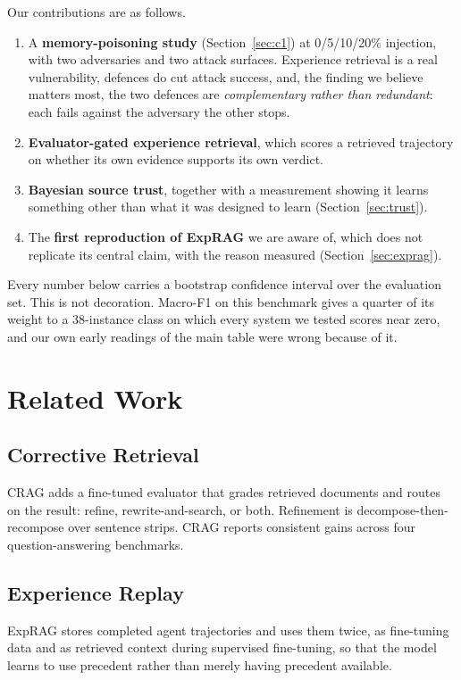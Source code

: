 \documentclass[journal]{IEEEtran}
\begin{document}
Our contributions are as follows.

\begin{enumerate}
\item A \textbf{memory-poisoning study} (Section~\ref{sec:c1}) at 0/5/10/20\%
injection, with two adversaries and two attack surfaces. Experience retrieval is
a real vulnerability, defences do cut attack success, and, the finding we
believe matters most, the two defences are \emph{complementary rather than
redundant}: each fails against the adversary the other stops.
\item \textbf{Evaluator-gated experience retrieval}, which scores a retrieved
trajectory on whether its own evidence supports its own verdict.
\item \textbf{Bayesian source trust}, together with a measurement showing it
learns something other than what it was designed to learn
(Section~\ref{sec:trust}).
\item The \textbf{first reproduction of ExpRAG} we are aware of, which does not
replicate its central claim, with the reason measured
(Section~\ref{sec:exprag}).
\end{enumerate}

Every number below carries a bootstrap confidence interval over the evaluation
set. This is not decoration. Macro-F1 on this benchmark gives a quarter of its
weight to a 38-instance class on which every system we tested scores near zero,
and our own early readings of the main table were wrong because of it.

\section{Related Work}

\subsection{Corrective Retrieval}
CRAG \cite{yan2024crag} adds a fine-tuned evaluator that grades retrieved
documents and routes on the result: refine, rewrite-and-search, or both.
Refinement is decompose-then-recompose over sentence strips. CRAG reports
consistent gains across four question-answering benchmarks.

\subsection{Experience Replay}
ExpRAG \cite{ferraz2026exprag} stores completed agent trajectories and uses them
twice, as fine-tuning data and as retrieved context during supervised
fine-tuning, so that the model learns to use precedent rather than merely having
precedent available.
\end{document}
